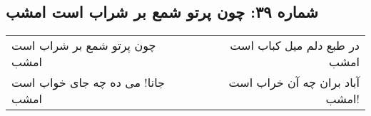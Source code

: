 \begin{center}
\section*{شماره ۳۹: چون پرتو شمع بر شراب است امشب}
\label{sec:039}
\begin{longtable}{l p{0.5cm} r}
چون پرتو شمع بر شراب است امشب
&&
در طبع دلم میل کباب است امشب
\\
جانا! می ده چه جای خواب است امشب
&&
آباد بران چه آن خراب است امشب!
\\
\end{longtable}
\end{center}
